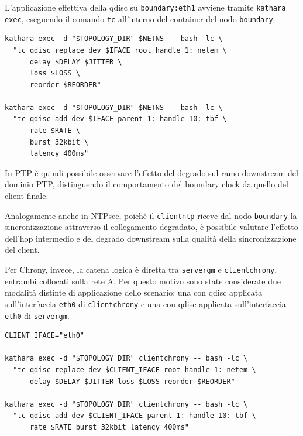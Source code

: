 L'applicazione effettiva della qdisc su \texttt{boundary:eth1} avviene tramite
\texttt{kathara exec}, eseguendo il comando \texttt{tc} all'interno del container
del nodo \texttt{boundary}.

\begin{listing}[H]
\begin{verbatim}
kathara exec -d "$TOPOLOGY_DIR" $NETNS -- bash -lc \
  "tc qdisc replace dev $IFACE root handle 1: netem \
      delay $DELAY $JITTER \
      loss $LOSS \
      reorder $REORDER"

kathara exec -d "$TOPOLOGY_DIR" $NETNS -- bash -lc \
  "tc qdisc add dev $IFACE parent 1: handle 10: tbf \
      rate $RATE \
      burst 32kbit \
      latency 400ms"
\end{verbatim}
\caption{Applicazione di netem e tbf su boundary:eth1.}
\label{lst:tc-boundary-eth1}
\end{listing}

In PTP è quindi possibile osservare l'effetto del degrado sul ramo downstream del
dominio PTP, distinguendo il comportamento del boundary clock da quello del
client finale.

Analogamente anche in NTPsec, poichè il \texttt{clientntp} riceve dal nodo
\texttt{boundary} la sincronizzazione attraverso il collegamento degradato, è
possibile valutare l'effetto dell'hop intermedio e del degrado downstream sulla
qualità della sincronizzazione del client.

Per Chrony, invece, la catena logica è diretta tra \texttt{servergm} e \texttt{clientchrony},
entrambi collocati sulla rete A. Per questo motivo sono state considerate due
modalità distinte di applicazione dello scenario: una con qdisc applicata sull'interfaccia
\texttt{eth0} di \texttt{clientchrony} e una con qdisc applicata sull'interfaccia
\texttt{eth0} di \texttt{servergm}.

\begin{listing}[H]
\begin{verbatim}
CLIENT_IFACE="eth0"

kathara exec -d "$TOPOLOGY_DIR" clientchrony -- bash -lc \
  "tc qdisc replace dev $CLIENT_IFACE root handle 1: netem \
      delay $DELAY $JITTER loss $LOSS reorder $REORDER"

kathara exec -d "$TOPOLOGY_DIR" clientchrony -- bash -lc \
  "tc qdisc add dev $CLIENT_IFACE parent 1: handle 10: tbf \
      rate $RATE burst 32kbit latency 400ms"
\end{verbatim}
\caption{Applicazione di netem e tbf su clientchrony:eth0.}
\label{lst:tc-clientchrony}
\end{listing}


